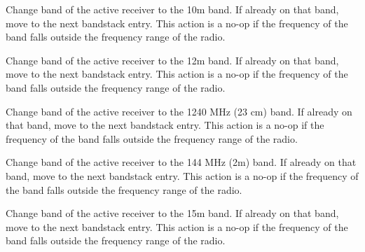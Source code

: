 \documentclass[12pt]{book}
\begin{document}









{Change band of the active receiver to the 10m band. If already on that band, move to
the next bandstack entry. This action is a no-op if the frequency of the band falls outside the frequency 
range of the radio.} 

{Change band of the active receiver to the 12m band. If already on that band, move to
the next bandstack entry. This action is a no-op if the frequency of the band falls outside the frequency range
of the radio.}

{Change band of the active receiver to the 1240 MHz (23 cm) band. If already on that band, move to
the next bandstack entry. This action is a no-op if the frequency of the band falls outside the frequency 
range of the radio.}

{Change band of the active receiver to the 144 MHz (2m) band. If already on that band, move to
the next bandstack entry. This action is a no-op if the frequency of the band falls outside the frequency 
range of the radio.}

{Change band of the active receiver to the 15m band. If already on that band, move to
the next bandstack entry. This action is a no-op if the frequency of the band falls outside the frequency 
range of the radio.}
\end{document}
